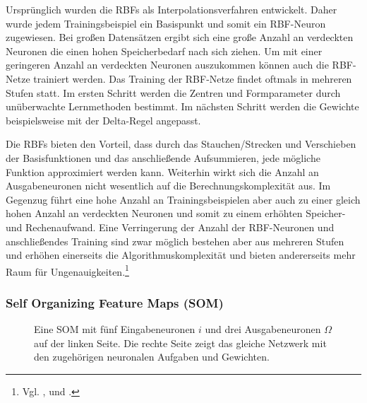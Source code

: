 Ursprünglich wurden die RBFs als Interpolationsverfahren entwickelt. Daher wurde jedem Trainingsbeispiel ein Basispunkt und somit ein RBF-Neuron zugewiesen. Bei großen Datensätzen ergibt sich eine große Anzahl an verdeckten Neuronen die einen hohen Speicherbedarf nach sich ziehen. Um mit einer geringeren Anzahl an verdeckten Neuronen auszukommen können auch die RBF-Netze trainiert werden. Das Training der RBF-Netze findet oftmals in mehreren Stufen statt. Im ersten Schritt werden die Zentren und Formparameter durch unüberwachte Lernmethoden bestimmt. Im nächsten Schritt werden die Gewichte beispielsweise mit der Delta-Regel angepasst.

Die RBFs bieten den Vorteil, dass durch das Stauchen/Strecken und Verschieben der Basisfunktionen und das anschließende Aufsummieren, jede mögliche Funktion approximiert werden kann. Weiterhin wirkt sich die Anzahl an Ausgabeneuronen nicht wesentlich auf die Berechnungskomplexität aus. Im Gegenzug führt eine hohe Anzahl an Trainingsbeispielen aber auch zu einer gleich hohen Anzahl an verdeckten Neuronen und somit zu einem erhöhten Speicher- und Rechenaufwand. Eine Verringerung der Anzahl der RBF-Neuronen und anschließendes Training sind zwar möglich bestehen aber aus mehreren Stufen und erhöhen einerseits die Algorithmuskomplexität und bieten andererseits mehr Raum für Ungenauigkeiten.\footnote{Vgl. \citet[73 ff]{comp_int_07}, \citet[109 ff]{dkriesel07} und \citet[261 ff]{Kroll16}.}



\subsubsection{Self Organizing Feature Maps (SOM)}
\begin{figure}[!htb]
    \centering
        
    \caption{Eine SOM mit fünf Eingabeneuronen $i$ und drei Ausgabeneuronen $\Omega$ auf der linken Seite. Die rechte Seite zeigt das gleiche Netzwerk mit den zugehörigen neuronalen Aufgaben und Gewichten.}
    \label{fig:SOM}
\end{figure}

